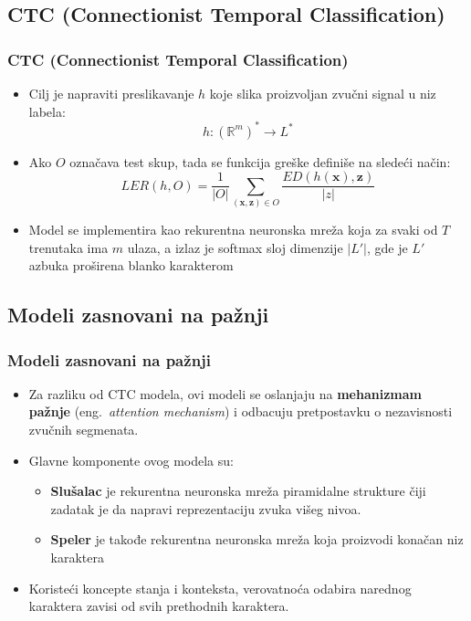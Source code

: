 \documentclass{beamer}
\begin{document}
\subsection{CTC (Connectionist Temporal Classification)}
\begin{frame}
  \frametitle{CTC (Connectionist Temporal Classification)}
  \begin{itemize}
      \item Cilj je napraviti preslikavanje $h$ koje slika proizvoljan zvučni signal u niz labela:
       \begin{equation}
        \label{eq:pres1}
        h: (\mathbb{R}^m)^* \rightarrow L^* 
        \end{equation}
        
        \item Ako $O$ označava test skup, tada se funkcija greške definiše na sledeći način:
        \begin{equation}
        \label{eq:LER}
        LER(h, O) = \frac{1}{|O|}\sum_{(\textbf{x}, \textbf{z}) \in O}\frac{ED(h(\textbf{x}), \textbf{z})}{|z|}
        \end{equation}
        \item Model se implementira kao rekurentna neuronska mreža koja za svaki od $T$ trenutaka ima $m$ ulaza, a izlaz je softmax sloj dimenzije $|L'|$, gde je $L'$ azbuka proširena blanko karakterom
  \end{itemize}
  
   
\end{frame}

\subsection{Modeli zasnovani na pažnji}
\begin{frame}
  \frametitle{Modeli zasnovani na pažnji}
  \begin{itemize}
      \item Za razliku od CTC modela, ovi modeli se oslanjaju na \textbf{mehanizmam pažnje} (eng.~{\em attention mechanism}) i odbacuju pretpostavku o nezavisnosti zvučnih segmenata.
      \item Glavne komponente ovog modela su:
        \begin{itemize} 
            \item \textbf{Slušalac}  je rekurentna neuronska mreža piramidalne strukture čiji zadatak je da napravi reprezentaciju zvuka višeg nivoa. 
            \item \textbf{Speler} je takođe rekurentna neuronska mreža koja proizvodi konačan niz karaktera
        \end{itemize}
       \item Koristeći koncepte stanja i konteksta, verovatnoća odabira narednog karaktera zavisi od svih prethodnih karaktera.
  \end{itemize}
\end{frame}
\end{document}
